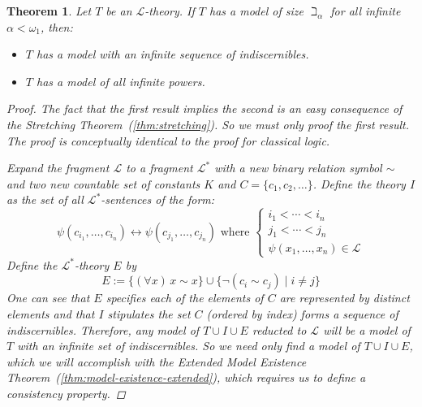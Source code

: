 \documentclass{amsart}
\newtheorem{theorem}{Theorem}[section]
\theoremstyle{definition}
\numberwithin{equation}{theorem}
\newcommand{\frag}{\mathcal{L}}
\begin{document}
\begin{theorem}\label{thm:hanf}
  Let $T$ be an $\frag$-theory.
  If $T$ has a model of size $\beth_\alpha$ for all infinite $\alpha<\omega_1$, then:
  \begin{itemize}
  \item $T$ has a model with an infinite sequence of indiscernibles.
  \item $T$ has a model of all infinite powers.
  \end{itemize}
  \begin{proof}
    The fact that the first result implies the second is an easy consequence of the Stretching Theorem~(\ref{thm:stretching}).
    So we must only proof the first result.
    The proof is conceptually identical to the proof for classical logic.
    
    Expand the fragment $\frag$ to a fragment $\frag^*$ with a new binary relation symbol $\sim$ and two new countable set of constants $K$ and $C=\{c_1,c_2,\dots\}$.
    Define the theory $I$ as the set of all $\frag^*$-sentences of the form:
    \[
      \psi(c_{i_1},\dots,c_{i_n})\leftrightarrow \psi(c_{j_1},\dots,c_{j_n})\text{ where }\left\{\begin{array}{l}i_1<\cdots<i_n\\j_1<\cdots<j_n\\\psi(x_1,\dots,x_n)\in\frag\end{array}\right.
    \]
    Define the $\frag^*$-theory $E$ by
    \[
      E:=\{(\forall x)\,x\sim x\}\cup\{\neg(c_i\sim c_j) \mid i\neq j\}
    \]
    One can see that $E$ specifies each of the elements of $C$ are represented by distinct elements and that $I$ stipulates the set $C$ (ordered by index) forms a sequence of indiscernibles.
    Therefore, any model of $T\cup I\cup E$ reducted to $\frag$ will be a model of $T$ with an infinite set of indiscernibles.
    So we need only find a model of $T\cup I\cup E$, which we will accomplish with the Extended Model Existence Theorem~(\ref{thm:model-existence-extended}), which requires us to define a consistency property.
    

\end{proof}
\end{theorem}
\end{document}
